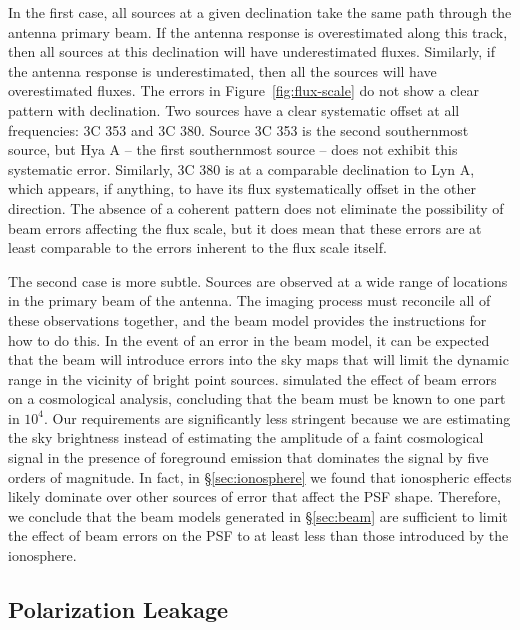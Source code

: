 \begin{bibunit}
In the first case, all sources at a given declination take the same path through the antenna primary
beam. If the antenna response is overestimated along this track, then all sources at this
declination will have underestimated fluxes. Similarly, if the antenna response is underestimated,
then all the sources will have overestimated fluxes. The errors in Figure~\ref{fig:flux-scale} do
not show a clear pattern with declination. Two sources have a clear systematic offset at all
frequencies: 3C 353 and 3C 380. Source 3C 353 is the second southernmost source, but Hya A -- the
first southernmost source -- does not exhibit this systematic error. Similarly, 3C 380 is at a
comparable declination to Lyn A, which appears, if anything, to have its flux systematically offset
in the other direction. The absence of a coherent pattern does not eliminate the possibility of beam
errors affecting the flux scale, but it does mean that these errors are at least comparable to the
errors inherent to the flux scale itself.

The second case is more subtle. Sources are observed at a wide range of locations in the primary
beam of the antenna. The imaging process must reconcile all of these observations together, and the
beam model provides the instructions for how to do this. In the event of an error in the beam model,
it can be expected that the beam will introduce errors into the sky maps that will limit the dynamic
range in the vicinity of bright point sources.  \citet{2015PhRvD..91h3514S} simulated the effect of
beam errors on a cosmological analysis, concluding that the beam must be known to one part in $10^4$.
Our requirements are significantly less stringent because we are estimating the sky brightness
instead of estimating the amplitude of a faint cosmological signal in the presence of foreground
emission that dominates the signal by five orders of magnitude. In fact, in \S\ref{sec:ionosphere}
we found that ionospheric effects likely dominate over other sources of error that affect the PSF
shape. Therefore, we conclude that the beam models generated in \S\ref{sec:beam} are sufficient to
limit the effect of beam errors on the PSF to at least less than those introduced by the ionosphere.

\subsection{Polarization Leakage}


\end{bibunit}
